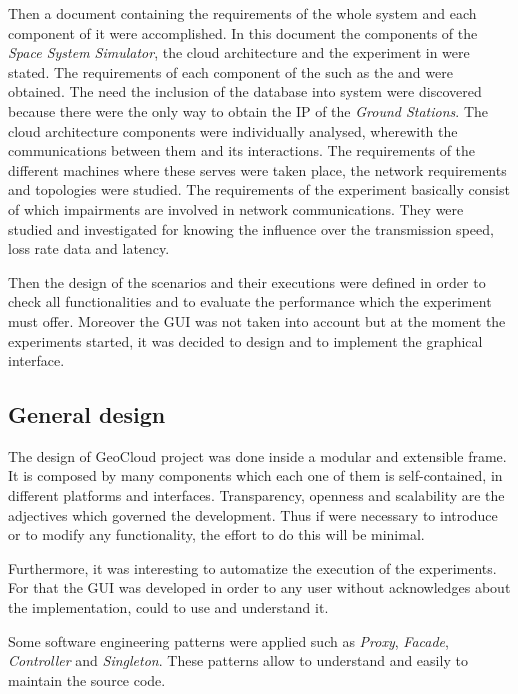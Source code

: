 Then a document containing the requirements of the whole system and each
component of it were accomplished. In this document the components of the
\emph{Space System Simulator},
the cloud architecture and the experiment in \pl were stated. The requirements
of each component of
the \sss such as the \satss and \gsss were obtained. The need the inclusion of
the database into system were discovered because there were the only way to obtain the
\ac{IP} of the \emph{Ground Stations}. The cloud architecture components were
individually analysed, wherewith the communications between them and its
interactions. The requirements of the different machines where these serves
were taken place, the network requirements and topologies were studied.  
The requirements of the \pl experiment basically consist of which impairments
are involved in network communications. They were studied and investigated for
knowing the influence over the transmission speed, loss rate data and latency.

Then the design of the scenarios and their executions were defined in order to
check all functionalities and to evaluate the performance which the experiment must offer.
Moreover the \ac{GUI} was not taken into account but at the moment the
experiments started, it was decided to design and to implement the graphical interface.


\subsection{General design}

The design of GeoCloud project was done inside a modular and extensible
frame. It is composed by many components which each one of them is
self-contained, in different platforms and interfaces. Transparency, openness
and scalability are the adjectives which governed the development. Thus if were
necessary to introduce or to modify any functionality, the effort to do this will
be minimal.

Furthermore, it was interesting to automatize the execution of the
experiments. For that the \ac{GUI} was developed in order to any user without acknowledges about the implementation, could to use and understand it.

Some software engineering patterns were applied such as \emph{Proxy},
\emph{Facade}, \emph{Controller} and \emph{Singleton}. These patterns allow to understand and easily to
maintain the source code. 

